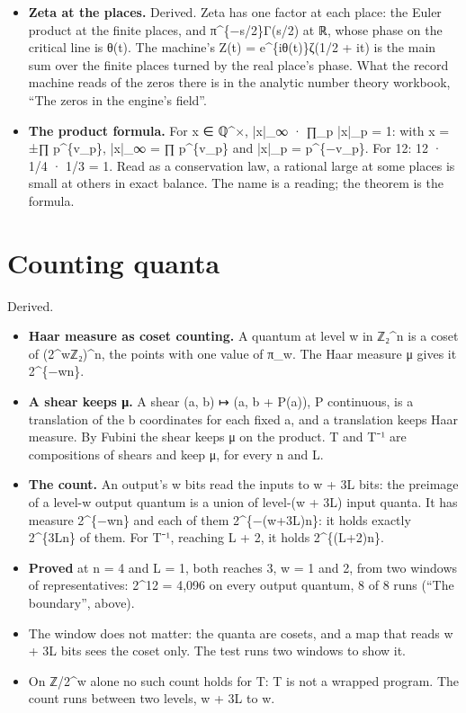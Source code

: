 \begin{itemize}
\item \textbf{Zeta at the places.} Derived. Zeta has one factor at each place: the Euler product at the finite places, and π\textasciicircum{}\{−s/2\}Γ(s/2) at ℝ, whose phase on the critical line is θ(t). The machine's Z(t) = e\textasciicircum{}\{iθ(t)\}ζ(1/2 + it) is the main sum over the finite places turned by the real place's phase. What the record machine reads of the zeros there is in the analytic number theory workbook, “The zeros in the engine's field”.
\item \textbf{The product formula.} For x ∈ ℚ\textasciicircum{}×, |x|\_\allowbreak{}∞ · ∏\_\allowbreak{}p |x|\_\allowbreak{}p = 1: with x = ±∏ p\textasciicircum{}\{v\_\allowbreak{}p\}, |x|\_\allowbreak{}∞ = ∏ p\textasciicircum{}\{v\_\allowbreak{}p\} and |x|\_\allowbreak{}p = p\textasciicircum{}\{−v\_\allowbreak{}p\}. For 12: 12 · 1/4 · 1/3 = 1. Read as a conservation law, a rational large at some places is small at others in exact balance. The name is a reading; the theorem is the formula.
\end{itemize}

\section{\texorpdfstring{Counting quanta}{Counting quanta}}

Derived.

\begin{itemize}
\item \textbf{Haar measure as coset counting.} A quantum at level w in ℤ₂\textasciicircum{}n is a coset of (2\textasciicircum{}wℤ₂)\textasciicircum{}n, the points with one value of π\_\allowbreak{}w. The Haar measure μ gives it 2\textasciicircum{}\{−wn\}.
\item \textbf{A shear keeps μ.} A shear (a, b) ↦ (a, b + P(a)), P continuous, is a translation of the b coordinates for each fixed a, and a translation keeps Haar measure. By Fubini the shear keeps μ on the product. T and T⁻¹ are compositions of shears and keep μ, for every n and L.
\item \textbf{The count.} An output's w bits read the inputs to w + 3L bits: the preimage of a level-w output quantum is a union of level-(w + 3L) input quanta. It has measure 2\textasciicircum{}\{−wn\} and each of them 2\textasciicircum{}\{−(w+3L)n\}: it holds exactly 2\textasciicircum{}\{3Ln\} of them. For T⁻¹, reaching L + 2, it holds 2\textasciicircum{}\{(L+2)n\}.
\item \textbf{Proved} at n = 4 and L = 1, both reaches 3, w = 1 and 2, from two windows of representatives: 2\textasciicircum{}12 = 4,096 on every output quantum, 8 of 8 runs (“The boundary”, above).
\item The window does not matter: the quanta are cosets, and a map that reads w + 3L bits sees the coset only. The test runs two windows to show it.
\item On ℤ/2\textasciicircum{}w alone no such count holds for T: T is not a wrapped program. The count runs between two levels, w + 3L to w.
\end{itemize}

